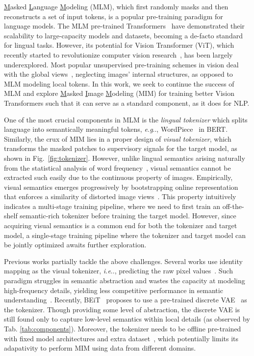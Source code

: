\documentclass{article} \usepackage{iclr2022_conference,times}
\makeatletter
\DeclareRobustCommand\onedot{\futurelet\@let@token\@onedot}
\def\@onedot{\ifx\@let@token.\else.\null\fi\xspace}
\def\eg{\emph{e.g}\onedot} \def\Eg{\emph{E.g}\onedot}
\def\ie{\emph{i.e}\onedot} \def\Ie{\emph{I.e}\onedot}
\makeatother
\begin{document}
\underline{M}asked \underline{L}anguage \underline{M}odeling (MLM), which first randomly masks and then reconstructs a set of input tokens, is a popular pre-training paradigm for language models.
The MLM pre-trained Transformers~\citep{bert} have demonstrated their scalability to large-capacity models and datasets, becoming a de-facto standard for lingual tasks.
However, its potential for Vision Transformer (ViT), which recently started to revolutionize computer vision research~\citep{deit, vit}, has been largely underexplored.
Most popular unsupervised pre-training schemes in vision deal with the global views~\citep{mocov3,dino}, neglecting images' internal structures, as opposed to MLM modeling local tokens.  
In this work, we seek to continue the success of MLM and explore \underline{M}asked \underline{I}mage \underline{M}odeling (MIM) for training better Vision Transformers such that it can serve as a standard component, as it does for NLP. 


One of the most crucial components in MLM is the \textit{lingual tokenizer} which splits language into semantically meaningful tokens, \eg, WordPiece~\citep{wordpiece} in BERT. 
Similarly, the crux of MIM lies in a proper design of \textit{visual tokenizer}, which transforms the masked patches to supervisory signals for the target model, as shown in Fig.~\ref{fig:tokenizer}.
However, unlike lingual semantics arising naturally from the statistical analysis of word frequency~\citep{bpe}, 
visual semantics cannot be extracted such easily due to the continuous property of images. Empirically, visual semantics emerges progressively by bootstrapping online representation that enforces a similarity of distorted image views~\citep{moco,byol,swav}.
This property intuitively indicates a multi-stage training pipeline, where we need to first train an off-the-shelf semantic-rich tokenizer before training the target model. However, since acquiring visual semantics is a common end for both the tokenizer and target model, a single-stage training pipeline where the tokenizer and target model can be jointly optimized awaits further exploration.

Previous works partially tackle the above challenges.
Several works use identity mapping as the visual tokenizer, \ie, predicting the raw pixel values~\citep{inpainting,sit}. Such paradigm struggles in semantic abstraction and wastes the capacity at modeling high-frequency details, yielding less competitive performance in semantic understanding~\citep{survey_gen_con}. 
Recently, BEiT~\citep{beit} proposes to use a pre-trained discrete VAE~\citep{dalle} as the tokenizer. Though providing some level of abstraction, the discrete VAE is still found only to capture low-level semantics within local details (as observed by Tab. \ref{tab:components}). 
Moreover, the tokenizer needs to be offline pre-trained with fixed model architectures and extra dataset~\citep{dalle}, which potentially limits its adapativity to perform MIM using data from different domains.
\end{document}
